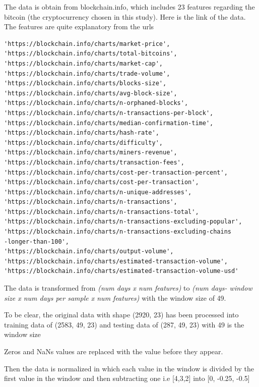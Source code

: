 \documentclass[a4paper,11pt]{article}
\begin{document}

The data is obtain from blockchain.info, which includes 23 features regarding the bitcoin (the cryptocurrency chosen in this study). Here is the link of the data. The features are quite explanatory from the urls

\begin{lstlisting}
'https://blockchain.info/charts/market-price',
'https://blockchain.info/charts/total-bitcoins',
'https://blockchain.info/charts/market-cap',
'https://blockchain.info/charts/trade-volume',
'https://blockchain.info/charts/blocks-size',
'https://blockchain.info/charts/avg-block-size',
'https://blockchain.info/charts/n-orphaned-blocks',
'https://blockchain.info/charts/n-transactions-per-block',
'https://blockchain.info/charts/median-confirmation-time',
'https://blockchain.info/charts/hash-rate',
'https://blockchain.info/charts/difficulty',
'https://blockchain.info/charts/miners-revenue',
'https://blockchain.info/charts/transaction-fees',
'https://blockchain.info/charts/cost-per-transaction-percent',
'https://blockchain.info/charts/cost-per-transaction',
'https://blockchain.info/charts/n-unique-addresses',
'https://blockchain.info/charts/n-transactions',
'https://blockchain.info/charts/n-transactions-total',
'https://blockchain.info/charts/n-transactions-excluding-popular',
'https://blockchain.info/charts/n-transactions-excluding-chains
-longer-than-100',
'https://blockchain.info/charts/output-volume',
'https://blockchain.info/charts/estimated-transaction-volume',
'https://blockchain.info/charts/estimated-transaction-volume-usd'
\end{lstlisting}

The data is transformed from \textit{(num days x num features)} to \textit{(num days- window size x num days per sample x num features)} with the window size of 49. 

To be clear, the original data with shape (2920, 23) has been processed into training data of (2583, 49, 23) and testing data of (287, 49, 23) with 49 is the window size

Zeros and NaNs values are replaced with the value before they appear. 

Then the data is normalized in which each value in the window is divided by the first value in the window and then subtracting one i.e [4,3,2] into [0, -0.25, -0.5]
\end{document}
